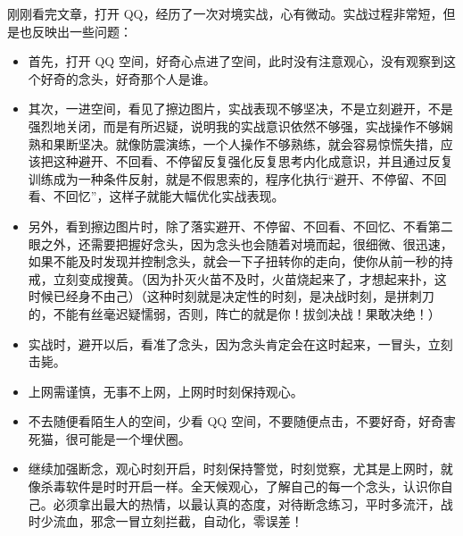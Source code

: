 \begin{case}[实战水平提升的过程]
    刚刚看完文章，打开 QQ，经历了一次对境实战，心有微动。实战过程非常短，但是也反映出一些问题：

    \begin{itemize}
        \item 首先，打开 QQ 空间，好奇心点进了空间，此时没有注意观心，没有观察到这个好奇的念头，好奇那个人是谁。
        \item 其次，一进空间，看见了擦边图片，实战表现不够坚决，不是立刻避开，不是强烈地关闭，而是有所迟疑，说明我的实战意识依然不够强，实战操作不够娴熟和果断坚决。就像防震演练，一个人操作不够熟练，就会容易惊慌失措，应该把这种避开、不回看、不停留反复强化反复思考内化成意识，并且通过反复训练成为一种条件反射，就是不假思索的，程序化执行“避开、不停留、不回看、不回忆”，这样子就能大幅优化实战表现。
        \item 另外，看到擦边图片时，除了落实避开、不停留、不回看、不回忆、不看第二眼之外，还需要把握好念头，因为念头也会随着对境而起，很细微、很迅速，如果不能及时发现并控制念头，就会一下子扭转你的走向，使你从前一秒的持戒，立刻变成搜黄。（因为扑灭火苗不及时，火苗烧起来了，才想起来扑，这时候已经身不由己）（这种时刻就是决定性的时刻，是决战时刻，是拼刺刀的，不能有丝毫迟疑懦弱，否则，阵亡的就是你！拔剑决战！果敢决绝！）
        \item 实战时，避开以后，看准了念头，因为念头肯定会在这时起来，一冒头，立刻击毙。
        \item 上网需谨慎，无事不上网，上网时时刻保持观心。
        \item 不去随便看陌生人的空间，少看 QQ 空间，不要随便点击，不要好奇，好奇害死猫，很可能是一个埋伏圈。
        \item 继续加强断念，观心时刻开启，时刻保持警觉，时刻觉察，尤其是上网时，就像杀毒软件是时时开启一样。全天候观心，了解自己的每一个念头，认识你自己。必须拿出最大的热情，以最认真的态度，对待断念练习，平时多流汗，战时少流血，邪念一冒立刻拦截，自动化，零误差！
    \end{itemize}


\end{case}
